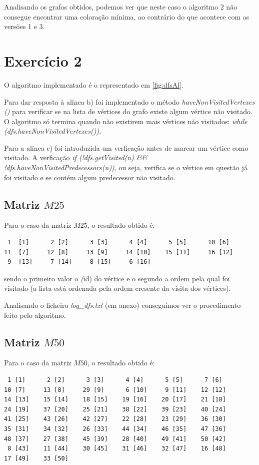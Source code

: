 \documentclass[a4paper,10pt]{report}
\begin{document}
Analisando os grafos obtidos, podemos ver que neste caso o algoritmo 2 não consegue encontrar uma coloração mínima, ao contrário do que acontece com as versões 1 e 3.

\section{Exercício 2}

O algoritmo implementado é o representado em \ref{fig:dfsAl}.

Para dar resposta à alínea b) foi implementado o método \textit{haveNonVisitedVertexes ()} para verificar se na lista de vértices do grafo existe algum vértice não visitado. O algoritmo só termina quando não existirem mais vértices não visitados: \textit{while (dfs.haveNonVisitedVertexes())}.

Para a alínea c) foi introduzida um verficação antes de marcar um vértice como visitado. A verficação \textit{if (!dfs.getVisited(n) \&\& !dfs.haveNonVisitedPredecessors(n))}, ou seja, verifica se o vértice em questão já foi visitado e se contém algum predecessor não visitado.

\subsection{Matriz $M25$}

Para o caso da matriz $M25$, o resultado obtido é:

\begin{lstlisting}
 1  [1]      2 [2]      3 [3]      4 [4]      5 [5]      10 [6]
11  [7]     12 [8]     13 [9]     14 [10]    15 [11]     16 [12]
 9  [13]     7 [14]     8 [15]     6 [16]
\end{lstlisting}

sendo o primeiro valor o \textit(id) do vértice e o segundo a ordem pela qual foi visitado (a lista está ordenada pela ordem cresente da visita dos vértices).

Analisando o ficheiro \textit{log\_dfs.txt} (em anexo) conseguimos ver o procedimento feito pelo algoritmo.

\subsection{Matriz $M50$}

Para o caso da matriz $M50$, o resultado obtido é:

\begin{lstlisting}
 1 [1]      2 [2]      3 [3]      4 [4]      5 [5]      7 [6]
10 [7]     13 [8]     29 [9]      6 [10]     9 [11]    12 [12]
14 [13]    15 [14]    18 [15]    19 [16]    20 [17]    21 [18]
24 [19]    37 [20]    25 [21]    38 [22]    39 [23]    40 [24]
41 [25]    43 [26]    42 [27]    22 [28]    23 [29]    36 [30]
35 [31]    34 [32]    26 [33]    44 [34]    46 [35]    47 [36]
48 [37]    27 [38]    45 [39]    28 [40]    49 [41]    50 [42]
 8 [43]    11 [44]    30 [45]    31 [46]    32 [47]    16 [48] 
17 [49]    33 [50] 
\end{lstlisting}
\end{document}
